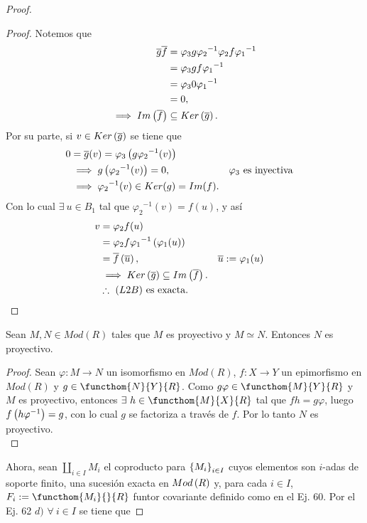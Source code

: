 \documentclass{article}
\begin{document}
\begin{enumerate}[label=\textbf{Ej \arabic*.}]
\begin{proof}
\begin{proof}
				Notemos que
				\begin{align*}
					\overline{g}\overline{f}&=\varphi_3
					g{\varphi_2}^{-1}\varphi_2 f{\varphi_1}^{-1}\\
					&=\varphi_3
					gf{\varphi_1}^{-1}\\
					&=\varphi_3 0 {\varphi_1}^{-1}\\
					&=0,\\
					\implies Im\left(\overline{f}\right)&\subseteq Ker\left(\overline{g}\right).
				\end{align*}
				Por su parte, si $v\in Ker\left(\overline{g}\right)$ se tiene que
				\begin{align*}
					0&=\overline{g}(v)=\varphi_3
					\left(g{\varphi_2}^{-1}(v)\right)\\
					&\implies g\left({\varphi_2}^{-1}(v)\right)=0, && \varphi_3\text{ es inyectiva}\\
					&\implies{\varphi_2}^{-1}(v)\in Ker(g)=Im(f).
				\end{align*}
				Con lo cual $\exists\ u\in B_1$ tal que ${\varphi_2}^{-1}(v)=f(u)$, y así \begin{align*}
					v&=\varphi_2 f(u)\\
					 &=\varphi_2 f{\varphi_1}^{-1}\left(\varphi_1(u)\right)\\
					 &=\overline{f}\left(\overline{u}\right), && \overline{u}:=\varphi_1(u)\\
					 &\implies Ker\left(\overline{g}\right)\subseteq Im\left(\overline{f}\right).\\
					 &\therefore\ (L2B)\text{ es exacta.}
				\end{align*}
			\end{proof}
			\begin{lem}
				Sean $M,N\in Mod(R)$ tales que $M$ es proyectivo y $M\simeq N$. Entonces $N$ es proyectivo.
			\end{lem}
			\begin{proof}
				Sean $\varphi:M\to N$ un isomorfismo en $Mod(R)$, $f:X\to Y$ un epimorfismo en $Mod(R)$ y $g\in\functhom{N}{Y}{R}$. Como $g\varphi \in\functhom{M}{Y}{R}$ y $M$ es proyectivo, entonces $\exists\ h\in\functhom{M}{X}{R}$ tal que $fh=g\varphi$, luego $f\left(h\varphi^{-1}\right)=g$, con lo cual $g$ se factoriza a través de $f$. Por lo tanto $N$ es proyectivo.\\
			\end{proof}
			Ahora, sean $\coprod\limits_{i\in I}M_i$ el coproducto para ${\left\{{M}_{i}\right\}}_{i\in I}$ cuyos elementos son $i$-adas de soporte finito,  una sucesión exacta en $Mod\left(R\right)$ y, para cada $i\in I$, $F_i:=\functhom{M_i}{}{R}$ funtor covariante definido como en el Ej. 60. Por el Ej. 62 $d)$ $\forall\ i\in I$ se tiene que

\end{proof}
\end{enumerate}
\end{document}
